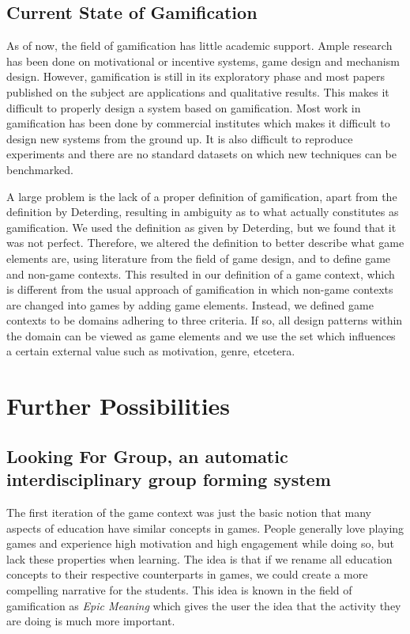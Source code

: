 \documentclass[11pt]{article}
\begin{document}
\subsection{Current State of Gamification}
As of now, the field of gamification has little academic support. Ample research has been done on motivational or incentive systems, game design and mechanism design.
However, gamification is still in its exploratory phase and most papers published on the subject are applications and qualitative results. This makes it difficult to properly design a system based on gamification. Most work in gamification has been done by commercial institutes which makes it difficult to design new systems from the ground up. It is also difficult to reproduce experiments and there are no standard datasets on which new techniques can be benchmarked.

A large problem is the lack of a proper definition of gamification, apart from the definition by Deterding, resulting in ambiguity as to what actually constitutes as gamification. We used the definition as given by Deterding, but we found that it was not perfect. Therefore, we altered the definition to better describe what game elements are, using literature from the field of game design, and to define game and non-game contexts. This resulted in our definition of a game context, which is different from the usual approach of gamification in which non-game contexts are changed into games by adding game elements. Instead, we defined game contexts to be domains adhering to three criteria. If so, all design patterns within the domain can be viewed as game elements and we use the set which influences a certain external value such as motivation, genre, etcetera.


\pagebreak
\footnotesize{


}

\pagebreak
\appendix
\section{Further Possibilities}
\subsection{Looking For Group, an automatic interdisciplinary group forming system}
The first iteration of the game context was just the basic notion that many aspects of education have similar concepts in games. People generally love playing games and experience high motivation and high engagement while doing so, but lack these properties when learning. The idea is that if we rename all education concepts to their respective counterparts in games, we could create a more compelling narrative for the students. This idea is known in the field of gamification as \emph{Epic Meaning} which gives the user the idea that the activity they are doing is much more important. 
\end{document}
